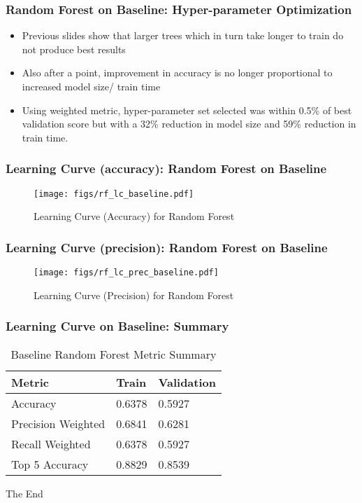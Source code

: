 \documentclass{beamer}
\begin{document}
\begin{frame}
\frametitle{Random Forest on Baseline: Hyper-parameter Optimization}
\begin{itemize}
	\item Previous slides show that larger trees which in turn take longer to train do not produce best results
	\item Also after a point, improvement in accuracy is no longer proportional to increased model size/ train time
	\item Using weighted metric, hyper-parameter set selected was within 0.5\% of best validation score but with a 32\% reduction in model size and 59\% reduction in train time.
\end{itemize}
\end{frame}

\begin{frame}
\frametitle{Learning Curve (accuracy): Random Forest on Baseline}
\begin{figure}
	\texttt{[image: figs/rf\_lc\_baseline.pdf]}
	\caption{Learning Curve (Accuracy) for Random Forest}
\end{figure}
\end{frame}

\begin{frame}
\frametitle{Learning Curve (precision): Random Forest on Baseline}
\begin{figure}
\texttt{[image: figs/rf\_lc\_prec\_baseline.pdf]}
\caption{Learning Curve (Precision) for Random Forest}
\end{figure}
\end{frame}

\begin{frame}
\frametitle{Learning Curve on Baseline: Summary }
\begin{table}[]
	\begin{tabular}{|l|l|l|}
		\hline
		Metric             & Train  & Validation \\ \hline
		Accuracy           & 0.6378 & 0.5927     \\ \hline
		Precision Weighted & 0.6841 & 0.6281     \\ \hline
		Recall Weighted    & 0.6378 & 0.5927     \\ \hline
		Top 5 Accuracy     & 0.8829 & 0.8539     \\ \hline
	\end{tabular}
	\caption{Baseline Random Forest Metric Summary}
	\label{table:tab_2}
\end{table}
\end{frame}

\begin{frame}
\Huge{\centerline{The End}}
\end{frame}

\end{document}
